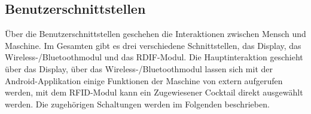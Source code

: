 \subsection{Benutzerschnittstellen}
\label{subsec:Benutzerschnittstellen}

Über die Benutzerschnittstellen geschehen die Interaktionen zwischen Mensch und Maschine. Im Gesamten gibt es drei verschiedene Schnittstellen, das Display, das Wireless-/Bluetoothmodul und das RDIF-Modul. Die Hauptinteraktion geschieht über das Display, über das Wireless-/Bluetoothmodul lassen sich mit der Android-Applikation einige Funktionen der Maschine von extern aufgerufen werden, mit dem RFID-Modul kann ein Zugewiesener Cocktail direkt ausgewählt werden. Die zugehörigen Schaltungen werden im Folgenden beschrieben.

%
%
% 